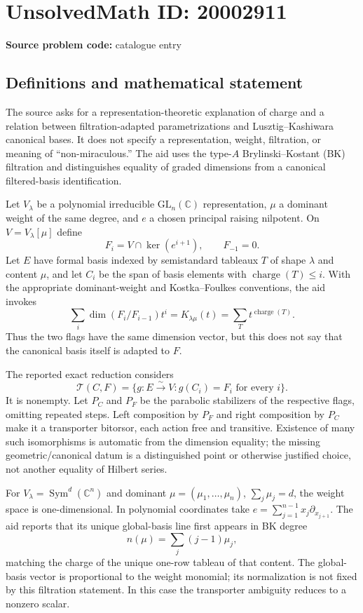 \documentclass[11pt]{article}
\newcommand{\C}{\mathbb{C}}
\begin{document}
\section*{UnsolvedMath ID: 20002911}
\textbf{Source problem code:} catalogue entry
\subsection{Definitions and mathematical statement}
The source asks for a representation-theoretic explanation of charge and a relation between filtration-adapted parametrizations and Lusztig--Kashiwara canonical bases. It does not specify a representation, weight, filtration, or meaning of ``non-miraculous.'' The aid uses the type-$A$ Brylinski--Kostant (BK) filtration and distinguishes equality of graded dimensions from a canonical filtered-basis identification.

Let $V_\lambda$ be a polynomial irreducible $\mathrm{GL}_n(\C)$ representation, $\mu$ a dominant weight of the same degree, and $e$ a chosen principal raising nilpotent. On $V=V_\lambda[\mu]$ define
\[
 F_i=V\cap\ker(e^{i+1}),\qquad F_{-1}=0.
\]
Let $E$ have formal basis indexed by semistandard tableaux $T$ of shape $\lambda$ and content $\mu$, and let $C_i$ be the span of basis elements with $\operatorname{charge}(T)\le i$. With the appropriate dominant-weight and Kostka--Foulkes conventions, the aid invokes
\[
 \sum_i\dim(F_i/F_{i-1})t^i
 =K_{\lambda\mu}(t)
 =\sum_Tt^{\operatorname{charge}(T)}.
\]
Thus the two flags have the same dimension vector, but this does not say that the canonical basis itself is adapted to $F$.

The reported exact reduction considers
\[
 \mathcal T(C,F)=\{g:E\xrightarrow{\sim}V:g(C_i)=F_i\text{ for every }i\}.
\]
It is nonempty. Let $P_C$ and $P_F$ be the parabolic stabilizers of the respective flags, omitting repeated steps. Left composition by $P_F$ and right composition by $P_C$ make it a transporter bitorsor, each action free and transitive. Existence of many such isomorphisms is automatic from the dimension equality; the missing geometric/canonical datum is a distinguished point or otherwise justified choice, not another equality of Hilbert series.

For $V_\lambda=\operatorname{Sym}^d(\C^n)$ and dominant $\mu=(\mu_1,\ldots,\mu_n)$, $\sum_j\mu_j=d$, the weight space is one-dimensional. In polynomial coordinates take $e=\sum_{j=1}^{n-1}x_j\partial_{x_{j+1}}$. The aid reports that its unique global-basis line first appears in BK degree
\[
 n(\mu)=\sum_j(j-1)\mu_j,
\]
matching the charge of the unique one-row tableau of that content. The global-basis vector is proportional to the weight monomial; its normalization is not fixed by this filtration statement. In this case the transporter ambiguity reduces to a nonzero scalar.
\end{document}

